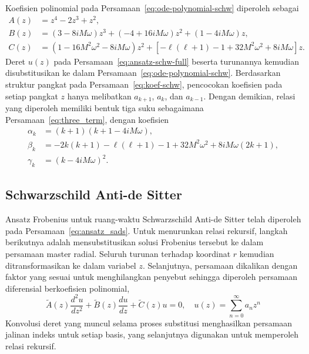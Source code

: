 Koefisien polinomial pada Persamaan~\eqref{eq:ode-polynomial-schw} diperoleh sebagai
\begin{equation}
    \begin{aligned}
        A(z) &= z^4-2z^3+z^2, \\
        B(z) &= (3-8iM\omega)z^3+(-4+16iM\omega)z^2+(1-4iM\omega)z, \\
        C(z) &= \left(1-16M^2\omega^2-8iM\omega\right)z^2+\left[-\ell(\ell+1)-1+32M^2\omega^2+8iM\omega\right]z.
    \end{aligned}
    \label{eq:koef-schw}
\end{equation}
Deret $u(z)$ pada Persamaan~\eqref{eq:ansatz-schw-full} beserta turunannya kemudian disubstitusikan ke dalam Persamaan~\eqref{eq:ode-polynomial-schw}. Berdasarkan struktur pangkat pada Persamaan~\eqref{eq:koef-schw}, pencocokan koefisien pada setiap pangkat $z$ hanya melibatkan $a_{k+1}$, $a_k$, dan $a_{k-1}$. Dengan demikian, relasi yang diperoleh memiliki bentuk tiga suku sebagaimana Persamaan~\eqref{eq:three_term}, dengan koefisien
\begin{equation}
    \begin{aligned}
        \alpha_k &= (k+1)(k+1-4iM\omega), \\
        \beta_k &= -2k(k+1)-\ell(\ell+1)-1+32M^2\omega^2+8iM\omega(2k+1), \\
        \gamma_k &= (k-4iM\omega)^2.
    \end{aligned}
    \label{eq:koef-rekurensi-schw}
\end{equation}

\subsection{Schwarzschild Anti-de Sitter}
\label{subsec:deriv-sads}

\noindent Ansatz Frobenius untuk ruang-waktu Schwarzschild Anti-de Sitter telah diperoleh pada
Persamaan~\eqref{eq:ansatz_sads}. Untuk menurunkan relasi rekursif, langkah berikutnya adalah mensubstitusikan solusi Frobenius tersebut ke dalam persamaan master radial. Seluruh turunan terhadap koordinat $r$ kemudian ditransformasikan ke dalam variabel $z$. Selanjutnya, persamaan dikalikan dengan faktor yang sesuai untuk menghilangkan penyebut sehingga diperoleh persamaan diferensial berkoefisien polinomial,
\begin{equation}
    \widetilde{A}(z)\frac{d^2u}{dz^2} + \widetilde{B}(z)\frac{du}{dz} + \widetilde{C}(z)u = 0, \quad u(z)=\sum_{n=0}^{\infty}a_n z^n 
\end{equation}
Konvolusi deret yang muncul selama proses substitusi menghasilkan persamaan jalinan indeks untuk setiap basis, yang selanjutnya digunakan untuk memperoleh relasi rekursif.

